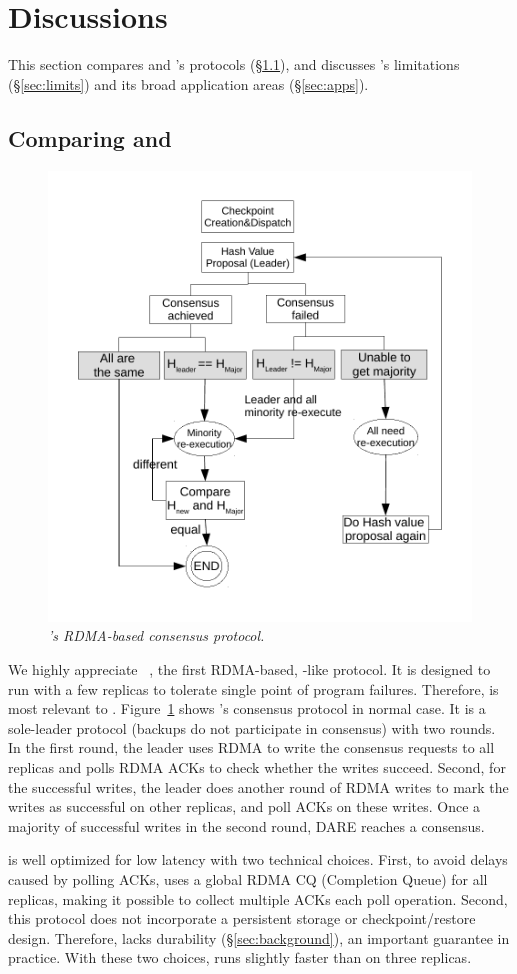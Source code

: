 \section{Discussions}\label{sec:discuss}
% 
This section compares \xxx and \dare's protocols (\S\ref{sec:compare}), and 
discusses \xxx's limitations (\S\ref{sec:limits}) and its broad application 
areas (\S\ref{sec:apps}).

\subsection{Comparing \xxx and \dare}\label{sec:compare}

\begin{figure}[t]
\centering
\vspace{-.10in}
\includegraphics[width=.4\textwidth]{figures/output-divergence}
\vspace{-.50in}
\caption{{\em \dare's RDMA-based consensus protocol.}} 
\label{fig:dare}
\vspace{-.20in}
\end{figure}

We highly appreciate \dare~\cite{dare:hpdc15}, the first RDMA-based, 
\paxos-like protocol. It is designed to run with a few replicas to tolerate 
single point of program failures. Therefore, \dare is most relevant to \xxx. 
Figure~\ref{fig:dare} shows \dare's consensus protocol in normal case. It is a 
sole-leader protocol (backups do not participate in consensus) with two rounds. 
In the first round, the leader uses RDMA to write the consensus requests to all 
replicas and polls RDMA ACKs to check whether the writes succeed. Second, for 
the successful writes, the leader does another round of RDMA writes to mark the 
writes as successful on other replicas, and poll ACKs on these writes. Once a 
majority of successful writes in the second round, DARE reaches a consensus.

\dare is well optimized for low latency with two technical choices. First, to 
avoid delays caused by polling ACKs, \dare uses a global RDMA CQ (Completion 
Queue) for all replicas, making it possible to collect multiple ACKs each poll 
operation. Second, this protocol does not incorporate a persistent storage or 
checkpoint/restore design. Therefore, \dare lacks durability 
(\S\ref{sec:background}), an important guarantee in \paxos practice. With these 
two choices, \dare runs slightly faster than \xxx on three replicas.

